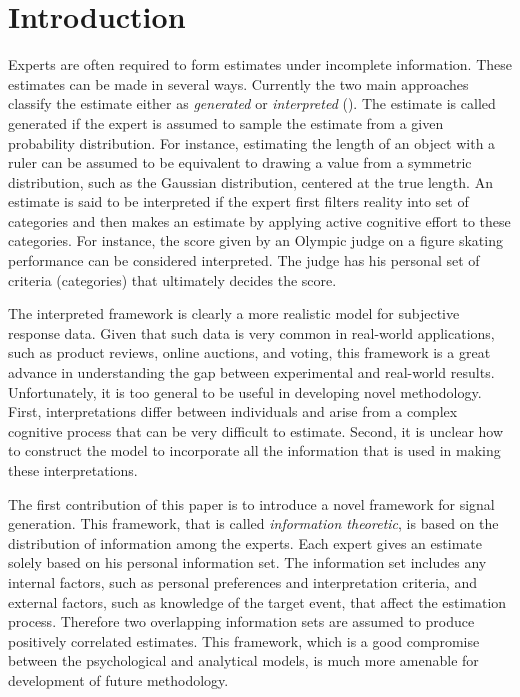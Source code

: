 \documentclass[11pt,twoside]{article}
\begin{document}
\section{Introduction}
Experts are often required to form estimates under incomplete information. These estimates can be made in several ways. Currently the two main approaches classify the estimate either as \textit{generated} or \textit{interpreted} (\cite{hong2009interpreted}). The estimate is called generated if the expert is assumed to sample the estimate from a given probability distribution. For instance, estimating the length of an object with a ruler can be assumed to be equivalent to drawing a value from a symmetric distribution, such as the Gaussian distribution, centered at the true length. An estimate is said to be interpreted if the expert first filters reality into set of categories and then makes an estimate by applying active cognitive effort to these categories. For instance, the score given by an Olympic judge on a figure skating performance can be considered interpreted. The judge has his personal set of criteria (categories) that ultimately decides the score. 

The interpreted framework is clearly a more realistic model for subjective response data. Given that such data is very common in real-world applications, such as product reviews, online auctions, and voting, this framework is a great advance in understanding the gap between experimental and real-world results. Unfortunately, it is too general to be useful in developing novel methodology. First,  interpretations differ between individuals and arise from a complex cognitive process that can be very difficult to estimate. Second, it is unclear how to construct the model to incorporate all the information that is used in making these interpretations.


The first contribution of this paper is to introduce a novel framework for signal generation. This framework, that is called \textit{information theoretic}, is based on the distribution of information among the experts. Each expert gives an estimate solely based on his personal information set. The information set includes any internal factors, such as personal preferences and interpretation criteria, and external factors, such as knowledge of the target event, that affect the estimation process. Therefore two overlapping information sets are assumed to produce positively correlated estimates. This framework, which is a good compromise between the psychological and analytical models, is much more amenable for development of future methodology. 
\end{document}

